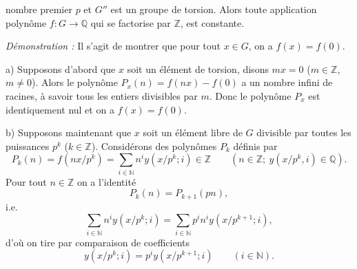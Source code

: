 nombre premier $p$ et $G''$ est un groupe de torsion. Alors toute application polynôme $f:G\to\mathbb Q$ qui se factorise par $\mathbb Z$, est constante.

\emph{Démonstration :} Il s'agit de montrer que pour tout $x\in G$, on a $f(x)=f(0)$.

a) Supposons d'abord que $x$ soit un élément de torsion, disons $mx=0$ ($m\in\mathbb Z$, $m\ne0$). Alors le polynôme $P_x(n)=f(nx)-f(0)$ a un nombre infini de racines, à savoir tous les entiers divisibles par $m$. Donc le polynôme $P_x$ est identiquement nul et on a $f(x)=f(0)$.

b) Supposons maintenant que $x$ soit un élément libre de $G$ divisible par toutes les puissances $p^k$ ($k\in\mathbb Z$). Considérons des polynômes $P_k$ définis par
\[
P_k(n)=f(nx/p^k)=\sum_{i\in\mathbb N}n^iy(x/p^k;i)\in\mathbb Z
\qquad(n\in\mathbb Z;\ y(x/p^k,i)\in\mathbb Q).
\]
Pour tout $n\in\mathbb Z$ on a l'identité
\[
P_k(n)=P_{k+1}(pn),
\]
i.e.
\[
\sum_{i\in\mathbb N}n^iy(x/p^k;i)=\sum_{i\in\mathbb N}p^in^iy(x/p^{k+1};i),
\]
d'où on tire par comparaison de coefficients
\[
y(x/p^k;i)=p^iy(x/p^{k+1};i)\qquad(i\in\mathbb N).
\]
